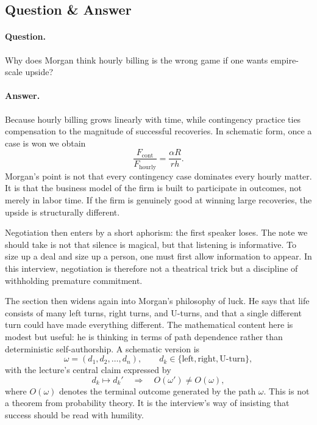 \subsection{Question \& Answer}

\paragraph{Question.} Why does Morgan think hourly billing is the wrong game if one wants empire-scale upside?

\paragraph{Answer.} Because hourly billing grows linearly with time, while contingency practice ties compensation to the magnitude of successful recoveries. In schematic form, once a case is won we obtain
\begin{equation}
\frac{F_{\mathrm{cont}}}{F_{\mathrm{hourly}}}
= \frac{\alpha R}{r h}.
\end{equation}
Morgan's point is not that every contingency case dominates every hourly matter. It is that the business model of the firm is built to participate in outcomes, not merely in labor time. If the firm is genuinely good at winning large recoveries, the upside is structurally different.

Negotiation then enters by a short aphorism: the first speaker loses. The note we should take is not that silence is magical, but that listening is informative. To size up a deal and size up a person, one must first allow information to appear. In this interview, negotiation is therefore not a theatrical trick but a discipline of withholding premature commitment.

The section then widens again into Morgan's philosophy of luck. He says that life consists of many left turns, right turns, and U-turns, and that a single different turn could have made everything different. The mathematical content here is modest but useful: he is thinking in terms of path dependence rather than deterministic self-authorship. A schematic version is
\begin{equation}
\omega = (d_1,d_2,\dots,d_n), \qquad d_k \in \{\text{left},\text{right},\text{U-turn}\},
\end{equation}
with the lecture's central claim expressed by
\begin{equation}
d_k \mapsto d_k' \quad \Longrightarrow \quad O(\omega') \neq O(\omega),
\end{equation}
where \(O(\omega)\) denotes the terminal outcome generated by the path \(\omega\). This is not a theorem from probability theory. It is the interview's way of insisting that success should be read with humility.

